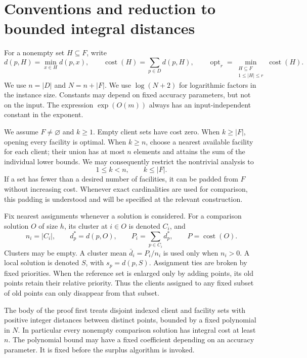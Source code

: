 \section{Conventions and reduction to bounded integral distances}
\label{pre:section}

For a nonempty set $H\subseteq F$, write
\[
 d(p,H)=\min_{x\in H}d(p,x),\qquad
 \operatorname{cost}(H)=\sum_{p\in D}d(p,H),\qquad
 \operatorname{opt}_r=\min_{\substack{H\subseteq F\\1\le|H|\le r}}
                          \operatorname{cost}(H).
\]
We use $n=|D|$ and $N=n+|F|$. We use $\log(N+2)$ for logarithmic
factors in the instance size. Constants may depend on fixed accuracy
parameters, but not on the input. The expression $\exp(O(m))$ always
has an input-independent constant in the exponent.

We assume $F\ne\varnothing$ and $k\ge1$. Empty client sets have cost zero.
When $k\ge |F|$, opening every facility is optimal. When $k\ge n$, choose
a nearest available facility for each client; their union has at most
$n$ elements and attains the sum of the individual lower bounds.
We may consequently restrict the nontrivial analysis to
\begin{equation}\label{pre:nontrivial}
 1\le k<n,\qquad k\le |F|.
\end{equation}
If a set has fewer than a desired number of facilities, it can be padded
from $F$ without increasing cost. Whenever exact cardinalities are used
for comparison, this padding is understood and will be specified at
the relevant construction.

Fix nearest assignments whenever a solution is considered. For a
comparison solution $O$ of size $h$, its cluster at $i\in O$ is denoted
$C_i$, and
\[
 n_i=|C_i|,\qquad d_p^*=d(p,O),\qquad
 P_i=\sum_{p\in C_i}d_p^*,\qquad P=\operatorname{cost}(O).
\]
Clusters may be empty. A cluster mean $\bar d_i=P_i/n_i$ is used only
when $n_i>0$. A local solution is denoted $S$, with $s_p=d(p,S)$.
Assignment ties are broken by fixed priorities. When the reference
set is enlarged only by adding points, its old points retain their
relative priority. Thus the clients assigned to any fixed subset of
old points can only disappear from that subset.

The body of the proof first treats disjoint indexed client and facility
sets with positive integer distances between distinct points, bounded
by a fixed polynomial in $N$. In particular every nonempty comparison
solution has integral cost at least $n$. The polynomial bound may have
a fixed coefficient depending on an accuracy parameter. It is fixed
before the surplus algorithm is invoked.

